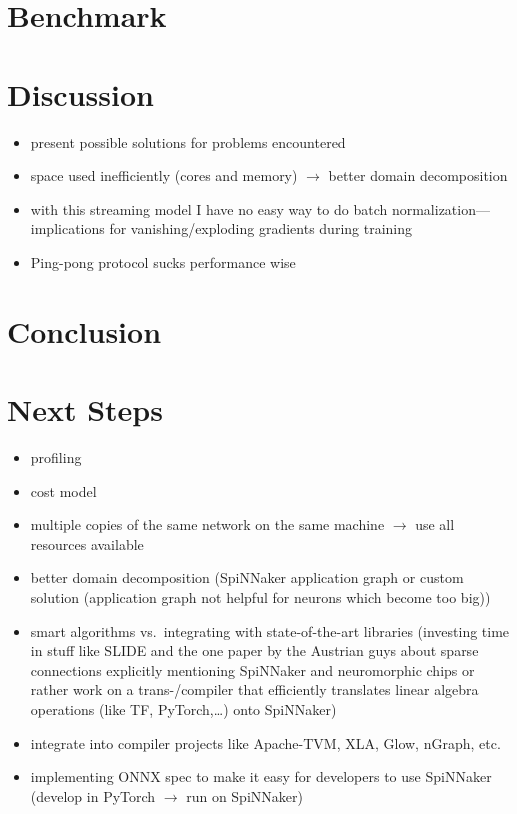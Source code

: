 \documentclass[]{article}
\begin{document}



\section{Benchmark}
\label{sec:benchmark}

\section{Discussion}
\label{sec:discussion}

\begin{itemize}
  \item present possible solutions for problems encountered
  \item space used inefficiently (cores and memory) $\rightarrow$ better
    domain decomposition
  \item with this streaming model I have no easy way to do batch
    normalization---implications for vanishing/exploding gradients
    during training
  \item Ping-pong protocol sucks performance wise
\end{itemize}

\section{Conclusion}
\label{sec:conclusion}

\section{Next Steps}
\label{sec:next_steps}

\begin{itemize}
  \item profiling
  \item cost model
  \item multiple copies of the same network on the same machine
    $\rightarrow$ use all resources available
  \item better domain decomposition (SpiNNaker application graph or
    custom solution (application graph not helpful for neurons which
    become too big))
  \item smart algorithms vs.\ integrating with state-of-the-art libraries
    (investing time in stuff like SLIDE and the one paper by the Austrian
    guys about sparse connections explicitly mentioning SpiNNaker and
    neuromorphic chips or rather work on a trans-/compiler
    that efficiently translates linear algebra operations (like TF,
    PyTorch,\dots) onto SpiNNaker)
  \item integrate into compiler projects like Apache-TVM, XLA, Glow,
   nGraph, etc.
  \item implementing ONNX spec to make it easy for developers to use
    SpiNNaker (develop in PyTorch $\rightarrow$ run on SpiNNaker)
\end{itemize}


\end{document}
